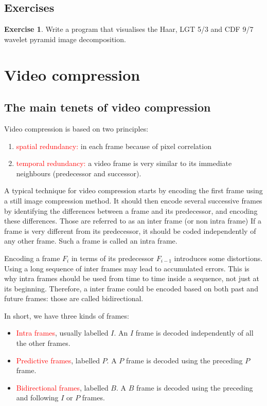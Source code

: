 \documentclass[a4paper, 11pt, openany]{book}
\numberwithin{equation}{section}
\theoremstyle{plain}
\theoremstyle{definition}
\newtheorem{exercise}   {Exercise}  [section]
\newcommand{\Important}[1]{\textcolor{red}{#1}}
\begin{document}
\subsection{Exercises}

\begin{exercise}
Write a program that visualises the Haar, LGT 5/3 and CDF 9/7 wavelet pyramid image decomposition.
\end{exercise}




\section{Video compression}
\label{sec:10}


\subsection{The main tenets of video compression}


Video compression is based on two principles:
\begin{enumerate}
    \item \Important{spatial redundancy:} in each frame because of pixel correlation
    
    \item \Important{temporal redundancy:} a video frame is very similar to its immediate neighbours (predecessor and successor).
\end{enumerate}

A typical technique for video compression starts by encoding the first frame using a still image compression method. It should then encode several successive frames by identifying the differences between a frame and
its predecessor, and encoding these differences. Those are referred to as an inter frame (or non intra frame) If a frame is very different from its predecessor, it should be coded independently of any other frame. Such a frame is called an intra frame. 

Encoding a frame $F_i$ in terms of its predecessor
$F_{i-1}$ introduces some distortions. Using a long sequence of inter frames may lead to accumulated errors. This
is why intra frames should be used from time to time inside a sequence, not just at its
beginning. Therefore, a inter frame could be encoded based on both past and future frames: those are called bidirectional.

In short, we have three kinds of frames:
\begin{itemize}
    \item \Important{Intra frames}, usually labelled $I$. An $I$ frame is decoded independently of all the other frames.
    
    \item \Important{Predictive frames}, labelled $P$. A $P$ frame is decoded using the preceding $P$ frame.
    
    \item \Important{Bidirectional frames}, labelled $B$. A $B$ frame is decoded using the preceding and following $I$ or $P$ frames.
\end{itemize}
\end{document}
